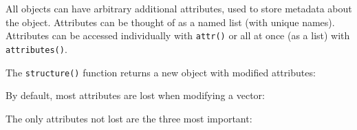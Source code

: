 
All objects can have arbitrary additional attributes, used to store
metadata about the object. Attributes can be thought of as a named list
(with unique names). Attributes can be accessed individually with
\texttt{attr()} or all at once (as a list) with \texttt{attributes()}.

\begin{Shaded}
\begin{Highlighting}[]
\StringTok{ }\NormalTok{:}
\NormalTok{) <-}
\NormalTok{)}
\NormalTok{(}
\end{Highlighting}
\end{Shaded}

The \texttt{structure()} function returns a new object with modified
attributes:

\begin{Shaded}
\begin{Highlighting}[]
\NormalTok{(}\NormalTok{:}\NormalTok{, } \NormalTok{)}
\end{Highlighting}
\end{Shaded}

By default, most attributes are lost when modifying a vector:

\begin{Shaded}
\begin{Highlighting}[]
\NormalTok{(y[}\NormalTok{])}
\NormalTok{(}
\end{Highlighting}
\end{Shaded}

The only attributes not lost are the three most important:

